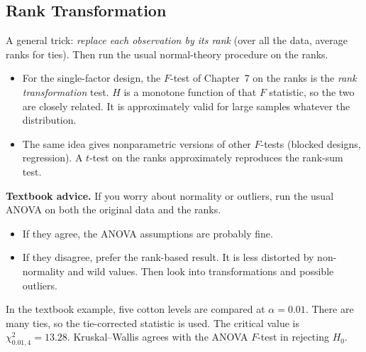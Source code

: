 \subsection{Rank Transformation}

A general trick: \emph{replace each observation by its rank} (over all the data, average ranks for ties). Then run the usual normal-theory procedure on the ranks.
\begin{itemize}
  \item For the single-factor design, the $F$-test of Chapter~7 on the ranks is the \emph{rank transformation} test. $H$ is a monotone function of that $F$ statistic, so the two are closely related. It is approximately valid for large samples whatever the distribution.
  \item The same idea gives nonparametric versions of other $F$-tests (blocked designs, regression). A $t$-test on the ranks approximately reproduces the rank-sum test.
\end{itemize}

\textbf{Textbook advice.} If you worry about normality or outliers, run the usual ANOVA on both the original data and the ranks.
\begin{itemize}
  \item If they agree, the ANOVA assumptions are probably fine.
  \item If they disagree, prefer the rank-based result. It is less distorted by non-normality and wild values. Then look into transformations and possible outliers.
\end{itemize}
In the textbook example, five cotton levels are compared at $\alpha=0.01$. There are many ties, so the tie-corrected statistic is used. The critical value is $\chi^2_{0.01,4}=13.28$. Kruskal--Wallis agrees with the ANOVA $F$-test in rejecting $H_0$.

